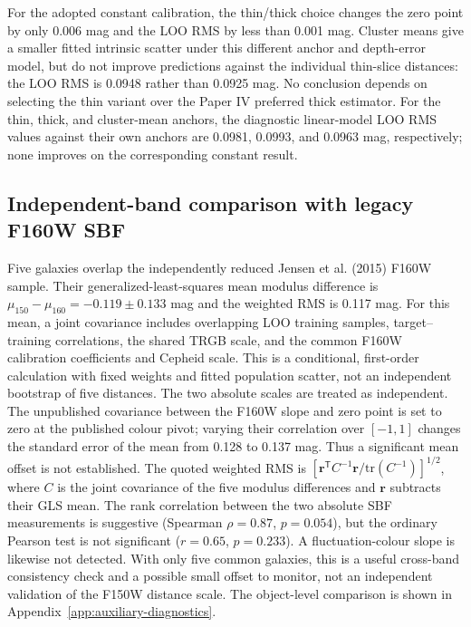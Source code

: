\documentclass[nodoi,nocopyright]{pas}
\begin{document}
For the adopted constant calibration, the thin/thick choice changes the zero
point by only 0.006 mag and the LOO RMS by less than 0.001 mag. Cluster means
give a smaller fitted intrinsic scatter under this different anchor and
depth-error model, but do not improve predictions against the
individual thin-slice distances: the LOO RMS is 0.0948 rather than
0.0925 mag. No conclusion depends on selecting the thin variant over
the Paper IV preferred thick estimator. For the thin, thick, and cluster-mean
anchors, the diagnostic linear-model LOO RMS values against their own anchors
are 0.0981, 0.0993, and 0.0963 mag, respectively; none improves on the
corresponding constant result.

\subsection{Independent-band comparison with legacy F160W SBF}

Five galaxies overlap the independently reduced Jensen et al. (2015) F160W
sample. Their generalized-least-squares mean modulus difference is
$\mu_{150}-\mu_{160}=-0.119\pm0.133$ mag and the weighted RMS is 0.117 mag.
For this mean, a joint covariance includes overlapping LOO training samples,
target--training correlations, the shared TRGB scale, and the common F160W
calibration coefficients and Cepheid scale. This is a conditional,
first-order calculation with fixed weights and fitted population scatter,
not an independent bootstrap of five distances. The two absolute scales
are treated as independent. The unpublished covariance between the F160W
slope and zero point is set to zero at the published colour pivot;
varying their correlation over $[-1,1]$ changes the standard error of the
mean from 0.128 to 0.137 mag. Thus a significant mean offset is not established.
The quoted weighted RMS is
$[\boldsymbol{r}^{\mathsf T}C^{-1}\boldsymbol{r}/\mathrm{tr}(C^{-1})]^{1/2}$,
where $C$ is the joint covariance of the five modulus differences and
$\boldsymbol{r}$ subtracts their GLS mean.
The rank correlation between the two absolute SBF measurements is suggestive
(Spearman $\rho=0.87$, $p=0.054$), but the ordinary Pearson test is not
significant ($r=0.65$, $p=0.233$). A fluctuation-colour slope is likewise not
detected. With only five common galaxies, this is a useful cross-band
consistency check and a possible small offset to monitor, not an independent
validation of the F150W distance scale. The object-level comparison is shown
in Appendix~\ref{app:auxiliary-diagnostics}.
\end{document}
